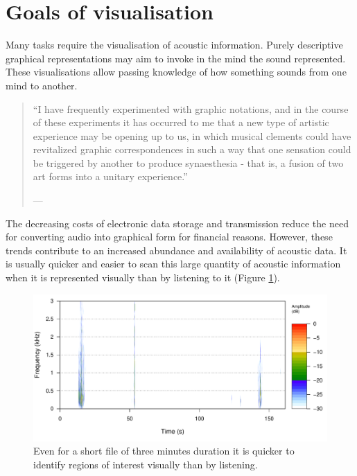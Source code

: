 \documentclass[
]{book}
\begin{document}
\hypertarget{goals-of-visualisation}{%
\section{Goals of visualisation}\label{goals-of-visualisation}}

Many tasks require the visualisation of acoustic information. Purely descriptive graphical representations may aim to invoke in the mind the sound represented. These visualisations allow passing knowledge of how something sounds from one mind to another.

\begin{quote}
``I have frequently experimented with graphic notations, and in the course of these experiments it has occurred to me that a new type of artistic experience may be opening up to us, in which musical clements could have revitalized graphic correspondences in such a way that one sensation could be triggered by another to produce synaesthesia - that is, a fusion of two art forms into a unitary experience.''

\hfill --- \citep{schafer1975}
\end{quote}

The decreasing costs of electronic data storage and transmission reduce the need for converting audio into graphical form for financial reasons. However, these trends contribute to an increased abundance and availability of acoustic data. It is usually quicker and easier to scan this large quantity of acoustic information when it is represented visually than by listening to it (Figure \ref{fig:quicker-visually}).

\begin{figure}

{\centering \includegraphics[width=0.9\linewidth]{_main_files/figure-latex/quicker-visually-1} 

}

\caption{Even for a short file of three minutes duration it is quicker to identify regions of interest visually than by listening.}\label{fig:quicker-visually}
\end{figure}
\end{document}
